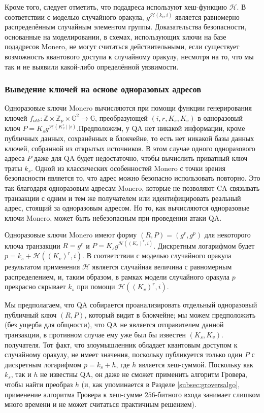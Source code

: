 \documentclass{mrl}
\begin{document}
Кроме того, следует отметить, что подадреса используют хеш-функцию $\mathcal{H}$. В соответствии с моделью случайного оракула, $g^{\mathcal{H}(k_v, i)}$ является равномерно распределённым случайным элементом группы. Доказательства безопасности, основанные на моделировании, в схемах, использующих ключи на базе подадресов Monero, не могут считаться действительными, если существует возможность квантового доступа к случайному оракулу, несмотря на то, что мы так и не выявили какой-либо определённой уязвимости.

\subsubsection{Выведение ключей на основе одноразовых адресов}\label{sec:single-otk}

Одноразовые ключи Monero вычисляются при помощи функции генерирования ключей $f_{otk}: \mathbb{Z} \times \mathbb{Z}_p \times \mathbb{G}^2 \to \mathbb{G}$, преобразующей $(i, r, K_s, K_v)$ в одноразовый ключ $P = K_s g^{\mathcal{H}(K_v^r \mid \mid i)}$.Предположим, у QA нет никакой информации, кроме публичных данных, сохранённых в блокчейне, то есть нет никакой базы данных ключей, собранной из открытых источников. В этом случае одного одноразового адреса $P$ даже для QA будет недостаточно, чтобы вычислить приватный ключ траты $k_s$. Одной из классических особенностей Monero с точки зрения безопасности является то, что адрес можно безопасно использовать повторно. Это так благодаря одноразовым адресам Monero, которые не позволяют CA связывать транзакции с одним и тем же получателем или идентифицировать реальный адрес, стоящий за одноразовым адресом. Но то, как вычисляются одноразовые ключи Monero, может быть небезопасным при проведении атаки QA.

Одноразовые ключи Monero имеют форму $(R, P) = (g^r, g^p)$ для некоторого ключа транзакции $R = g^r$ и $P = K_s g^{\mathcal{H}((K_v)^r, i)}$. Дискретным логарифмом будет $p = k_s + \mathcal{H}((K_v)^r, i)$. В соответствии с моделью случайного оракула результатом применения $\mathcal{H}$ является случайная величина с равномерным распределением, и, таким образом, в рамках модели случайного оракула $p$ прекрасно скрывает $k_s$ при помощи $\mathcal{H}((K_v)^r, i)$. 

Мы предполагаем, что QA собирается проанализировать отдельный одноразовый публичный ключ $(R, P)$, который видит в блокчейне; мы можем предположить (без ущерба для общности), что QA не является отправителем данной транзакции, в противном случае ему уже был бы известен $(K_s, K_v)$. получателя. Тот факт, что злоумышленник обладает квантовым доступом к случайному оракулу, не имеет значения, поскольку публикуется только один $P$ с дискретным логарифмом $p = k_s + h$, где $h$ является хеш-суммой. Поскольку как $k_s$, так и $h$ не известны QA, он даже не сможет применить алгоритм Гровера, чтобы найти преобраз $h$ (и, как упоминается в Разделе \ref{subsec:groversalgo}, применение алгоритма Гровера к хеш-сумме $256$-битного входа занимает слишком много времени и не может считаться практичным решением).
\end{document}
